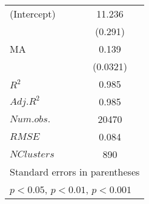 \begin{table}[H]
\begin{minipage}[t]{0.45\columnwidth}
\begin{center}
{\begin{tabular}{l*{4}{c}}
\hline
(Intercept)    &       &      &       11.236\sym{***}&       \\
               &       &      &        (0.291)       &        \\
[1em]
 MA            &       &      &      0.139\sym{***} &          \\
               &      &       &     (0.0321)       &           \\
[1em]
\hline
\(R^{2}\)      &      &       &        0.985        &          \\
\(Adj.R^{2}\)  &      &       &       0.985         &         \\
\(Num.obs.\)   &      &       &    20470            &          \\
\(RMSE\)       &      &       &    0.084            &          \\
\(N Clusters\) &      &       &    890              &          \\
\hline\hline
\multicolumn{5}{l}{\footnotesize Standard errors in parentheses}\\
\multicolumn{5}{l}{\footnotesize \sym{*} \(p<0.05\), \sym{**} \(p<0.01\), \sym{***} \(p<0.001\)}\\
\end{tabular}
}
  \end{center}
  \end{minipage}
  \end{table}
  

